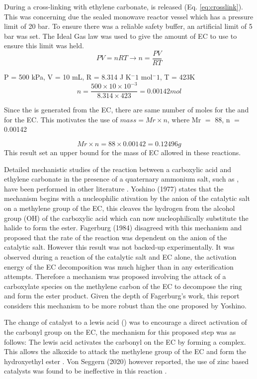 During a cross-linking with ethylene carbonate,  is released (Eq. \ref{eq:crosslink}). This was concerning due the sealed monowave reactor vessel which has a pressure limit of 20 bar. To ensure there was a reliable safety buffer, an artificial limit of 5 bar was set. The Ideal Gas law was used to give the amount of EC to use to ensure this limit was held.
\[PV = nRT \rightarrow n = \frac{PV}{RT}\]
\begin{center}
    P = 500 kPa, V = 10 mL, R = 8.314 J K${^-1}$ mol${^-1}$, T = 423K
\[n = \frac{500 \times 10 \times 10^{-3}}{8.314 \times 423} = 0.00142mol\]

Since the  is generated from the EC, there are same number of moles for the  and for the EC. This motivates the use of $ mass = Mr \times n$, where Mr $=$ 88, n $=$ 0.00142 
\end{center}
\[ Mr \times n = 88 \times 0.00142 =  0.12496g\] 
This result set an upper bound for the mass of EC allowed in these reactions.

Detailed mechanistic studies of the reaction between a carboxylic acid and ethylene carbonate in the presence of a quaternary ammonium salt, such as , have been performed in other literature \cite{yoshino1977synthetic,fagerburg1984reaction,fagerburg1985reaction}. Yoshino (1977) states that the mechanism begins with a nucleophilic ativation by the anion of the catalytic salt on a methylene group of the EC, this cleaves the hydrogen from the alcohol group (OH) of the carboxylic acid which can now nucleophilically substitute the halide to form the ester. Fagerburg (1984) disagreed with this mechanism and proposed that the rate of the reaction was dependent on the anion of the catalytic salt. However this result was not backed-up experimentally. It was observed during a reaction of the catalytic salt and EC alone, the activation energy of the EC decomposition was much higher than in any esterification attempts. Therefore a mechanism was proposed involving the attack of a carboxylate species on the methylene carbon of the EC to decompose the ring and form the ester product. Given the depth of Fagerburg's work, this report considers this mechanism to be more robust than the one proposed by Yoshino.

The change of catalyst to a lewis acid () was to encourage a direct activation of the carbonyl group on the EC, the mechanism for this proposed step was as follows: The lewis acid activates the carbonyl on the EC by forming a complex. This allows the alkoxide to attack the methylene group of the EC and form the hydroxyethyl ester \cite{von2020dual}. Von Seggern (2020) however reported, the use of zinc based catalysts was found to be ineffective in this reaction \cite{von2020dual}. 


